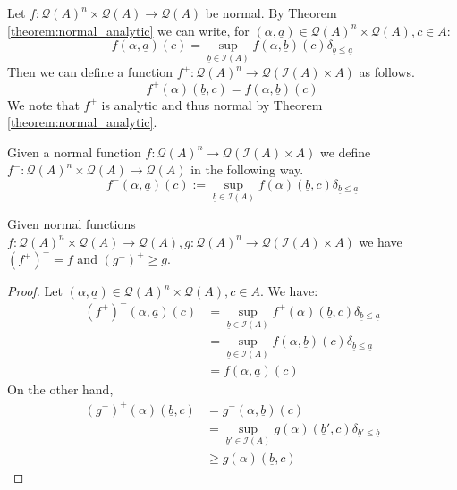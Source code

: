 \documentclass[runningheads]{llncs}
\newcommand{\call}[1]{\mathcal{#1}}
\newcommand{\Ical}{\call{I}}
\newcommand{\Qcal}{\call{Q}}
\newcommand{\lto}{\longrightarrow}
\begin{document}
	\begin{definition}
		Let $f: \Qcal(A)^{n} \times \Qcal(A) \lto \Qcal(A)$ be normal. By Theorem \ref{theorem:normal_analytic} we can write, for $(\alpha, \underline{a}) \in \Qcal(A)^{n} \times \Qcal(A), c \in A$:
		\begin{equation}\label{eq:variables}
			f(\alpha, \underline{a})(c) = \operatorname{sup}_{\underline{b} \in \Ical(A)}f(\alpha, \underline{b})(c)\delta_{\underline{b} \leq \underline{a}}
		\end{equation}
		Then we can define a function $f^+: \Qcal(A)^{n} \lto \Qcal(\Ical(A) \times A)$ as follows.
		\begin{equation}
			f^+(\alpha)(\underline{b}, c) = f(\alpha, \underline{b})(c)
		\end{equation}
		We note that $f^+$ is analytic and thus normal by Theorem \ref{theorem:normal_analytic}.
		
		Given a normal function $f: \Qcal(A)^n \lto \Qcal(\Ical(A) \times A)$ we define $f^-: \Qcal(A)^{n} \times \Qcal(A) \lto \Qcal(A)$ in the following way.
		\begin{equation}
			f^-(\alpha, \underline{a})(c) := \operatorname{sup}_{\underline{b} \in \Ical(A)}f(\alpha)(\underline{b}, c)\delta_{\underline{b} \leq \underline{a}}
			\end{equation}
		\end{definition}
	
	\begin{proposition}\label{theorem:adjunction}
		Given normal functions $f: \Qcal(A)^n \times \Qcal(A) \lto \Qcal(A), g: \Qcal(A)^n \lto \Qcal(\Ical(A) \times A)$ we have $(f^+)^- = f$ and $(g^-)^+ \geq g$.
    \end{proposition}
	\begin{proof}
	Let $(\alpha, \underline{a}) \in \Qcal(A)^{n} \times \Qcal(A), c \in A$. We have:
	\begin{align*}
		(f^+)^-(\alpha, \underline{a})(c) &= \operatorname{sup}_{\underline{b} \in \Ical(A)}f^+(\alpha)(\underline{b},c)\delta_{\underline{b} \leq \underline{a}}\\
		&=  \operatorname{sup}_{\underline{b} \in \Ical(A)}f(\alpha, \underline{b})(c)\delta_{\underline{b} \leq \underline{a}}\\
		&=f(\alpha, \underline{a})(c)
	\end{align*}
On the other hand,
\begin{align*}
	(g^-)^+(\alpha)(\underline{b},c) &= g^-(\alpha, \underline{b})(c)\\
	&= \operatorname{sup}_{\underline{b}' \in \Ical(A)}g(\alpha)(\underline{b}', c)\delta_{\underline{b}' \leq \underline{b}}\\
	&\geq g(\alpha)(\underline{b},c)
	\end{align*}
	\end{proof}
	
\end{document}
